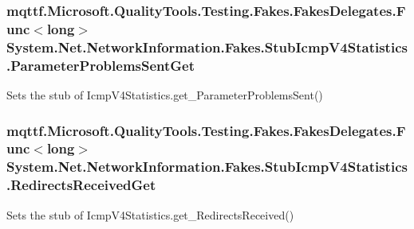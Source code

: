 \hypertarget{class_system_1_1_net_1_1_network_information_1_1_fakes_1_1_stub_icmp_v4_statistics_a6171c2e5199b2bc2ecbc16eed5bf456f}{
\subsubsection[{Parameter\-Problems\-Sent\-Get}]{\setlength{\rightskip}{0pt plus 5cm}mqttf.\-Microsoft.\-Quality\-Tools.\-Testing.\-Fakes.\-Fakes\-Delegates.\-Func$<$long$>$ System.\-Net.\-Network\-Information.\-Fakes.\-Stub\-Icmp\-V4\-Statistics.\-Parameter\-Problems\-Sent\-Get}}\label{class_system_1_1_net_1_1_network_information_1_1_fakes_1_1_stub_icmp_v4_statistics_a6171c2e5199b2bc2ecbc16eed5bf456f}


Sets the stub of Icmp\-V4\-Statistics.\-get\-\_\-\-Parameter\-Problems\-Sent()

\hypertarget{class_system_1_1_net_1_1_network_information_1_1_fakes_1_1_stub_icmp_v4_statistics_a7e4bef71a382e0670ea668e8abdb50ae}{
\subsubsection[{Redirects\-Received\-Get}]{\setlength{\rightskip}{0pt plus 5cm}mqttf.\-Microsoft.\-Quality\-Tools.\-Testing.\-Fakes.\-Fakes\-Delegates.\-Func$<$long$>$ System.\-Net.\-Network\-Information.\-Fakes.\-Stub\-Icmp\-V4\-Statistics.\-Redirects\-Received\-Get}}\label{class_system_1_1_net_1_1_network_information_1_1_fakes_1_1_stub_icmp_v4_statistics_a7e4bef71a382e0670ea668e8abdb50ae}


Sets the stub of Icmp\-V4\-Statistics.\-get\-\_\-\-Redirects\-Received()

